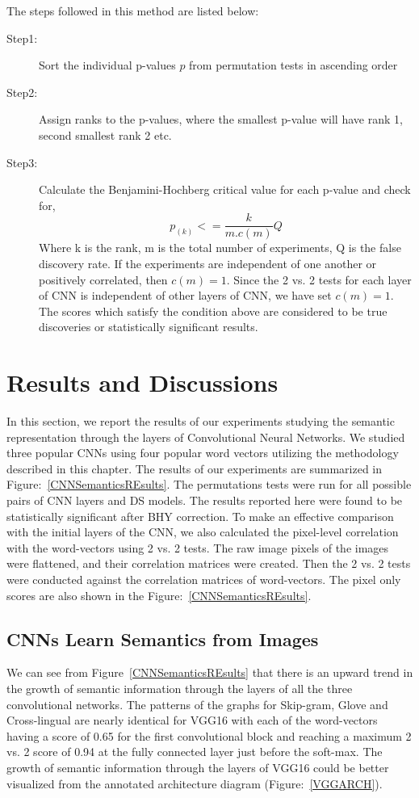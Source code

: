 The steps followed in this method are listed below:
\begin{description}
\item[Step1:] {Sort the individual p-values $p$ from permutation tests in ascending order}
\item[Step2:] {Assign ranks to the p-values, where the smallest p-value will have rank 1, second smallest rank 2 etc.} 
\item[Step3:] {Calculate the Benjamini-Hochberg critical value for each p-value and check for,
    \[p_{(k)}<=\frac{k}{m.c(m)}Q\]
Where k is the rank, m is the total number of experiments, Q is the false discovery rate. If the experiments are independent of one another or positively correlated, then $c(m) =1$. Since the 2 vs. 2 tests for each layer of CNN is independent of other layers of CNN, we have set $c(m) =1$. The scores which satisfy the condition above are considered to be true discoveries or statistically significant results.}
\end{description}

\section{Results and Discussions}

In this section, we report the results of our experiments studying the semantic representation through the layers of Convolutional Neural Networks. We studied three popular CNNs using four popular word vectors utilizing the methodology described in this chapter. The results of our experiments are summarized in Figure:~\ref{CNNSemanticsREsults}. The permutations tests were run for
all possible pairs of CNN layers and DS models. The results reported here were found to be statistically significant after BHY correction. To make an effective comparison with the initial layers of the CNN, we also calculated the pixel-level correlation with the word-vectors using 2 vs. 2 tests. The raw image pixels of the images were flattened, and their correlation matrices were created. Then the 2 vs. 2 tests were conducted against the correlation matrices of word-vectors. The pixel only scores are also shown in the Figure:~\ref{CNNSemanticsREsults}.




\subsection{CNNs Learn Semantics from Images}

We can see from Figure~\ref{CNNSemanticsREsults} that there is an upward trend in the growth of semantic information through the layers of all the three convolutional networks. The patterns of the graphs for Skip-gram, Glove and Cross-lingual are nearly identical for VGG16 with each of the word-vectors having a score of 0.65 for the first convolutional block and reaching a maximum 2 vs. 2 score of 0.94 at the fully connected layer just before the soft-max. The growth of semantic information through the layers of VGG16 could be better visualized from the annotated architecture diagram (Figure:~\ref{VGGARCH}).




